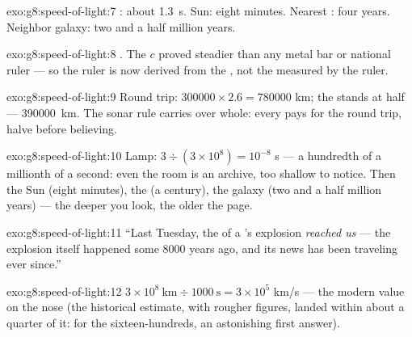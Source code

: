 \begin{solution}{exo:g8:speed-of-light:7}
: about \qty{1.3}{s}. Sun: eight minutes. Nearest :
four years. Neighbor galaxy: two and a half million years.
\end{solution}

\begin{solution}{exo:g8:speed-of-light:8}
. The  $c$ proved steadier than any metal bar or
national ruler --- so the ruler is now derived from the ,
not the  measured by the ruler.
\end{solution}

\begin{solution}{exo:g8:speed-of-light:9}
Round trip: $300000 \times 2.6 = 780000$ km; the  stands
at half --- \qty{390000}{km}. The sonar rule carries over
whole: every  pays for the round trip, halve before
believing.
\end{solution}

\begin{solution}{exo:g8:speed-of-light:10}
Lamp: $3 \div (3 \times 10^{8}) = 10^{-8}$ s --- a hundredth
of a millionth of a second: even the room is an archive, too
shallow to notice. Then the Sun (eight minutes), the  (a
century), the galaxy (two and a half million years) --- the
deeper you look, the older the page.
\end{solution}

\begin{solution}{exo:g8:speed-of-light:11}
``Last Tuesday, the  of a 's explosion \emph{reached
us} --- the explosion itself happened some $8000$ years ago,
and its news has been traveling ever since.''
\end{solution}

\begin{solution}{exo:g8:speed-of-light:12}
$3 \times 10^{8}\ \text{km} \div 1000\ \text{s} = 3 \times
10^{5}$ \unit{km/s} --- the modern value on the nose (the
historical estimate, with rougher  figures, landed
within about a quarter of it: for the sixteen-hundreds, an
astonishing first answer).
\end{solution}

